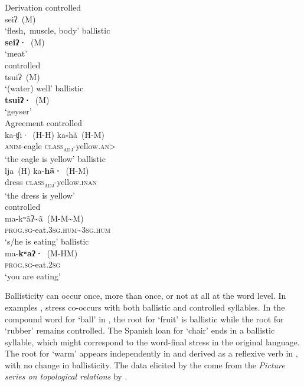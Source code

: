 \documentclass[output=paper]{langscibook}
\begin{document}
\ea Derivation\label{extab:dobui:6deriv}
     \ea
          \ea controlled\\
                seiʔ~(M)\\
               \glt ‘flesh,~muscle, body’
          \ex  ballistic \\
               \textbf{seiʔ·}~(M)\\
               \glt ‘meat’\\
          \z
     \ex
          \ea  controlled\\
               tsuiʔ~(M)\\
               \glt ‘(water) well’
          \ex  ballistic \\
               \textbf{tsuiʔ·}~(M)\\
               \glt ‘geyser’\\
          \z
     \z
\z
\ea Agreement\label{extab:dobui:6end}\label{extab:dobui:6agreement}
     \ea
          \ea controlled\\
               \gll ka-ʧi·~(H-H) ka\textbf{-}hã~(H-M)\\
                    \textsc{anim}-eagle \textsc{class}\textsc{\textsubscript{adj}}-yellow.\textsc{an>}\\
               \glt ‘the eagle is yellow’
          \ex ballistic\\
               \gll  lja~(H) ka-\textbf{hã·}~(H-M)\\
                    dress \textsc{class}\textsc{\textsubscript{adj}}-yellow.\textsc{inan}\\
               \glt ‘the dress is yellow’\\
          \z
     \ex
          \ea controlled\\
               \gll  ma-kʷãʔ{\textasciitilde}ã~(M-M{\textasciitilde}M)\\
                    \textsc{prog.sg}-eat.3\textsc{sg.hum}{\textasciitilde}3\textsc{sg.hum}\\
               \glt  ‘s/he is eating’
          \ex ballistic\\
               \gll ma-\textbf{kʷaʔ·}~(M-HM)\\
               \textsc{prog.sg}-eat.2\textsc{sg}\\
               \glt ‘you are eating’\\
          \z
     \z
\z



Ballisticity can occur once, more than once, or not at all at the word level. In examples , stress co-occurs with both ballistic and controlled syllables. In the compound word for ‘ball’ in , the root for ‘fruit’ is ballistic while the root for ‘rubber’ remains controlled. The Spanish loan for ‘chair’ ends in a ballistic syllable, which might correspond to the word-final stress in the original language. The root for ‘warm’ appears independently in  and derived as a reflexive verb in , with no change in ballisticity. The data elicited by the \citet{ELA2012} come from the \textit{Picture series on topological relations} by \citet{BowermanPederson1992}.
\end{document}
